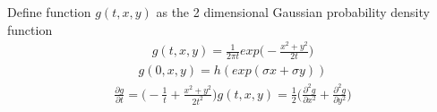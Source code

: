 \documentclass[12pt]{article}
\newenvironment{solution}[2][Solution]{\begin{trivlist}
\item[\hskip \labelsep {\bfseries #1}\hskip \labelsep {\bfseries #2.}]}{\end{trivlist}}
\newenvironment{question}[2][Question]{\begin{trivlist}
\item[\hskip \labelsep {\bfseries #1}\hskip \labelsep {\bfseries #2.}]}{\end{trivlist}}
\begin{document}
\begin{solution}[Solution]
\flushleft{Define function $g(t,x,y)$ as the 2 dimensional Gaussian probability density function}
\begin{align*}
    g(t,x,y) = \frac{1}{2\pi t}exp\bigg(-\frac{x^2+y^2}{2t}\bigg)
\end{align*}
\begin{align*}
    g(0,x,y)=h(exp(\sigma x +\sigma y))
\end{align*}
\begin{align*}
        \frac{\partial g}{\partial t} = \bigg(-\frac{1}{t} + \frac{x^2 + y^2}{2t^2} \bigg)g(t,x,y) = \frac{1}{2}\bigg(\frac{\partial^2 g}{\partial x^2} + \frac{\partial^2 g}{\partial y^2}\bigg)
\end{align*}
\end{solution}

\begin{question}{10}
\end{question}
\begin{solution}[Solution] \\ 
\flushleft{\ }
\end{solution}


 
\end{document}
